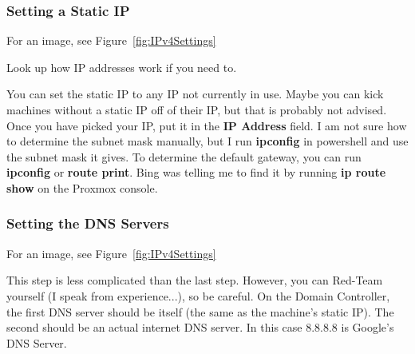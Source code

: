 \documentclass{article}
\begin{document}
\subsubsection{Setting a Static IP}
For an image, see Figure~\ref{fig:IPv4Settings}

\noindent Look up how IP addresses work if you need to.

You can set the static IP to any IP not currently in use.
Maybe you can kick machines without a static IP off of their IP, but that is probably not advised.
Once you have picked your IP, put it in the \textbf{IP Address} field.
I am not sure how to determine the subnet mask manually, but I run \textbf{ipconfig} in powershell
and use the subnet mask it gives.
To determine the default gateway, you can run \textbf{ipconfig} or \textbf{route print}.
Bing was telling me to find it by running \textbf{ip route show} on the Proxmox console.


\subsubsection{Setting the DNS Servers}
For an image, see Figure~\ref{fig:IPv4Settings}

This step is less complicated than the last step. However, you can Red-Team yourself (I speak from experience...), so be careful.
On the Domain Controller, the first DNS server should be itself (the same as the machine's static IP). The second should be an actual internet DNS server.
In this case 8.8.8.8 is Google's DNS Server.
\end{document}
